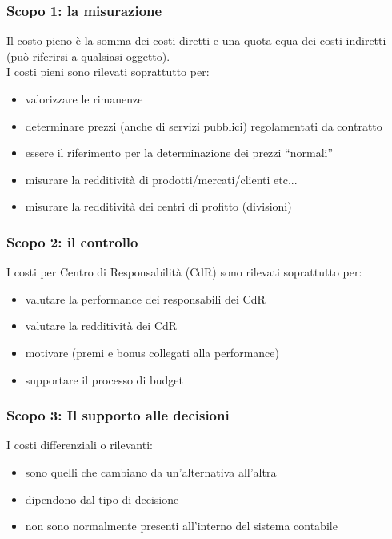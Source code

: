 \documentclass{article}
\begin{document}
\subsubsection{Scopo 1: la misurazione}
Il costo pieno è la somma dei costi diretti e una quota equa dei
costi indiretti (può riferirsi a qualsiasi oggetto).
\vspace*{0.2cm}\\
I costi pieni sono rilevati soprattutto per:
\begin{itemize}
    \item valorizzare le rimanenze
    \item determinare prezzi (anche di servizi pubblici) regolamentati da contratto
    \item essere il riferimento per la determinazione dei prezzi “normali”
    \item misurare la redditività di prodotti/mercati/clienti etc...
    \item misurare la redditività dei centri di profitto (divisioni)
\end{itemize}


\subsubsection{Scopo 2: il controllo}
I costi per Centro di Responsabilità (CdR) sono rilevati soprattutto
per:
\begin{itemize}
    \item valutare la performance dei responsabili dei CdR
    \item valutare la redditività dei CdR
    \item motivare (premi e bonus collegati alla performance)
    \item supportare il processo di budget
\end{itemize}


\subsubsection{Scopo 3: Il supporto alle decisioni}
I costi differenziali o rilevanti:
\begin{itemize}
    \item sono quelli che cambiano da un'alternativa all'altra
    \item dipendono dal tipo di decisione
    \item non sono normalmente presenti all'interno del sistema contabile
\end{itemize}
\end{document}
